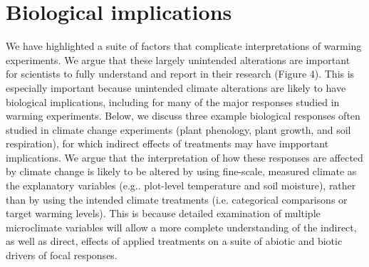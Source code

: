 \documentclass{article}
\begin{document}
\section* {Biological implications}
\par We have highlighted a suite of factors that complicate interpretations of warming experiments. We argue that these largely unintended alterations are important for scientists to fully understand and report in their research (Figure 4). This is especially important because unintended climate alterations are likely to have biological implications, including for many of the major responses studied in warming experiments. Below, we discuss three example biological responses often studied in climate change experiments (plant phenology, plant growth, and soil respiration), for which indirect effects of treatments may have impportant implications. We argue that the interpretation of how these responses are affected by climate change is likely to be altered by using fine-scale, measured climate as the explanatory variables (e.g.. plot-level temperature and soil moisture), rather than by using the intended climate treatments (i.e. categorical comparisons or target warming levels). This is because detailed examination of multiple microclimate variables will allow a more complete understanding of the indirect, as well as direct, effects of applied treatments on a suite of abiotic and biotic drivers of focal responses.
\end{document}
